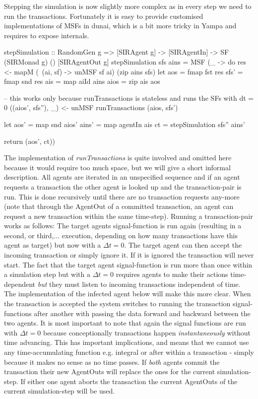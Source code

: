 Stepping the simulation is now slightly more complex as in every step we need to run the transactions. Fortunately it is easy to provide customised implementations of MSFs in dunai, which is a bit more tricky in Yampa and requires to expose internals.

\begin{HaskellCode}
stepSimulation :: RandomGen g => [SIRAgent g] -> [SIRAgentIn] -> SF (SIRMonad g) () [SIRAgentOut g]
stepSimulation sfs ains = MSF (\_ -> do
  res <- mapM (\ (ai, sf) -> unMSF sf ai) (zip ains sfs)
  let aos  = fmap fst res
      sfs' = fmap snd res
      ais  = map aiId ains
      aios = zip ais aos

  -- this works only because runTransactions is stateless and runs the SFs with dt = 0
  ((aios', sfs''), _) <- unMSF runTransactions (aios, sfs')

  let aos'  = map snd aios'
      ains' = map agentIn ais
      ct    = stepSimulation sfs'' ains'
      
  return (aos', ct))
\end{HaskellCode}

The implementation of \textit{runTransactions} is quite involved and omitted here because it would require too much space, but we will give a short informal description. All agents are iterated in an unspecified sequence and if an agent requests a transaction the other agent is looked up and the transaction-pair is run. This is done recursively until there are no transaction requests any-more (note that through the AgentOut of a committed transaction, an agent can request a new transaction within the same time-step). Running a transaction-pair works as follows:
The target agents signal-function is run again (resulting in a second, or third,... execution, depending on how many transactions have this agent as target) but now with a $\Delta t = 0$. The target agent can then accept the incoming transaction or simply ignore it. If it is ignored the transaction will never start. The fact that the target agent signal-function is run more than once within a simulation step but with a $\Delta t = 0$ requires agents to make their actions time-dependent \textit{but} they must listen to incoming transactions independent of time. The implementation of the infected agent below will make this more clear.
When the transaction is accepted the system switches to running the transaction signal-functions after another with passing the data forward and backward between the two agents. It is most important to note that again the signal functions are run with $\Delta t = 0$ because conceptionally transactions happen \textit{instantaneously} without time advancing. This has important implications, and means that we cannot use any time-accumulating function e.g. integral or after within a transaction - simply because it makes no sense as no time passes. If \textit{both} agents commit the transaction their new AgentOuts will replace the ones for the current simulation-step. If either one agent aborts the transaction the current AgentOuts of the current simulation-step will be used.

